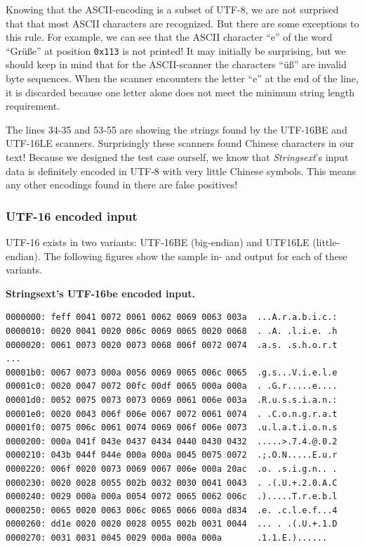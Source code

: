 Knowing that the ASCII-encoding is a subset of UTF-8, we are not
surprised that that most ASCII characters are recognized. But there are
some exceptions to this rule. For example, we can see that the ASCII
character ``e'' of the word ``Grüße'' at position \texttt{0x113} is not
printed! It may initially be surprising, but we should keep in mind that
for the ASCII-scanner the cha­rac­ters ``üß'' are invalid byte
sequences. When the scanner encounters the letter ``e'' at the end of
the line, it is discarded because one letter alone does not meet the
minimum string length requirement.

The lines 34-35 and 53-55 are showing the strings found by the UTF-16BE
and UTF-16LE scanners. Surprisingly these scanners found Chinese
cha­rac­ters in our text! Because we designed the test case ourself, we
know that \emph{Strings­ext}'s input data is definitely encoded in UTF-8
with very little Chinese symbols. This means any other encodings found
in there are false positives!

\hypertarget{_utf_16_encoded_input}{\subsubsection{UTF-16 encoded
input}\label{_utf_16_encoded_input}}

UTF-16 exists in two variants: UTF-16BE (big-endian) and UTF16LE
(little-endian). The following figures show the sample in- and output
for each of these variants.

\textbf{Strings­ext's UTF-16be encoded input.}

\begin{verbatim}
0000000: feff 0041 0072 0061 0062 0069 0063 003a  ...A.r.a.b.i.c.:
0000010: 0020 0041 0020 006c 0069 0065 0020 0068  . .A. .l.i.e. .h
0000020: 0061 0073 0020 0073 0068 006f 0072 0074  .a.s. .s.h.o.r.t
...
00001b0: 0067 0073 000a 0056 0069 0065 006c 0065  .g.s...V.i.e.l.e
00001c0: 0020 0047 0072 00fc 00df 0065 000a 000a  . .G.r.....e....
00001d0: 0052 0075 0073 0073 0069 0061 006e 003a  .R.u.s.s.i.a.n.:
00001e0: 0020 0043 006f 006e 0067 0072 0061 0074  . .C.o.n.g.r.a.t
00001f0: 0075 006c 0061 0074 0069 006f 006e 0073  .u.l.a.t.i.o.n.s
0000200: 000a 041f 043e 0437 0434 0440 0430 0432  .....>.7.4.@.0.2
0000210: 043b 044f 044e 000a 000a 0045 0075 0072  .;.O.N.....E.u.r
0000220: 006f 0020 0073 0069 0067 006e 000a 20ac  .o. .s.i.g.n.. .
0000230: 0020 0028 0055 002b 0032 0030 0041 0043  . .(.U.+.2.0.A.C
0000240: 0029 000a 000a 0054 0072 0065 0062 006c  .).....T.r.e.b.l
0000250: 0065 0020 0063 006c 0065 0066 000a d834  .e. .c.l.e.f...4
0000260: dd1e 0020 0020 0028 0055 002b 0031 0044  ... . .(.U.+.1.D
0000270: 0031 0031 0045 0029 000a 000a 000a       .1.1.E.)......
\end{verbatim}

